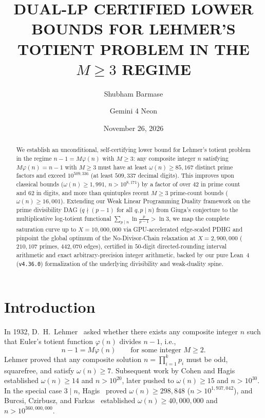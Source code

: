 \documentclass[11pt]{amsart}
\title[Dual-LP Lower Bounds for Lehmer's Totient Problem ($M \ge 3$)]{%
    DUAL-LP CERTIFIED LOWER BOUNDS FOR LEHMER'S\\
    TOTIENT PROBLEM IN THE $M \ge 3$ REGIME}
\author{Shubham Barmase}
\author{Gemini 4 Neon}
\date{November 26, 2026}
\theoremstyle{remark}
\numberwithin{equation}{section}
\begin{document}
\begin{abstract}
We establish an unconditional, self-certifying lower bound for Lehmer's totient problem in the regime $n - 1 = M\varphi(n)$ with $M \ge 3$: any composite integer $n$ satisfying $M\varphi(n) = n - 1$ with $M \ge 3$ must have at least $\omega(n) \ge 85{,}167$ distinct prime factors and exceed $10^{509{,}336}$ (at least $509{,}337$ decimal digits). This improves upon classical bounds ($\omega(n) \ge 1{,}991$, $n > 10^{8{,}171}$) by a factor of over $42$ in prime count and $62$ in digits, and more than quintuples recent $M \ge 3$ prime-count bounds ($\omega(n) \ge 16{,}001$). Extending our Weak Linear Programming Duality framework on the prime divisibility DAG ($q \nmid (p - 1)$ for all $q, p \mid n$) from Giuga's conjecture to the multiplicative log-totient functional $\sum_{p \mid n} \ln\frac{p}{p-1} > \ln 3$, we map the complete saturation curve up to $X = 10{,}000{,}000$ via GPU-accelerated edge-scaled PDHG and pinpoint the global optimum of the No-Divisor-Chain relaxation at $X = 2{,}900{,}000$ ($210{,}107$ primes, $442{,}070$ edges), certified in $50$-digit directed-rounding interval arithmetic and exact arbitrary-precision integer arithmetic, backed by our pure Lean~4 (\texttt{v4.36.0}) formalization of the underlying divisibility and weak-duality spine.
\end{abstract}

\setcounter{tocdepth}{1}
\maketitle

{\setlength{\parskip}{1pt}\tableofcontents}
\vspace{0.8em}

\section{Introduction}

In 1932, D.~H.~Lehmer~\cite{Lehmer1932} asked whether there exists any composite integer $n$ such that Euler's totient function $\varphi(n)$ divides $n - 1$, i.e.,
\begin{equation}\label{eq:lehmer}
    n - 1 = M \varphi(n) \qquad \text{for some integer } M \ge 2.
\end{equation}
Lehmer proved that any composite solution $n = \prod_{i=1}^k p_i$ must be odd, squarefree, and satisfy $\omega(n) \ge 7$. Subsequent work by Cohen and Hagis~\cite{CohenHagis1980} established $\omega(n) \ge 14$ and $n > 10^{20}$, later pushed to $\omega(n) \ge 15$ and $n > 10^{30}$. In the special case $3 \mid n$, Hagis~\cite{Hagis1988} proved $\omega(n) \ge 298{,}848$ ($n > 10^{1{,}937{,}042}$), and Burcsi, Czirbusz, and Farkas~\cite{BCF2011} established $\omega(n) \ge 40{,}000{,}000$ and $n > 10^{360{,}000{,}000}$.
\end{document}
